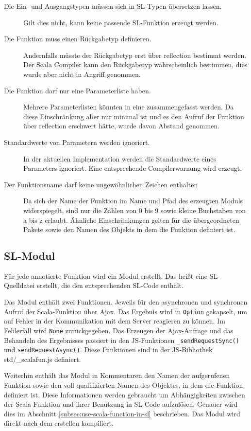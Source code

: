 \documentclass[12pt,bibtotoc]{scrreprt}
\begin{document}
\begin{description}
 \item[Die Ein- und Ausgangstypen müssen sich in SL-Typen übersetzen lassen.]{Gilt dies nicht, kann keine passende SL-Funktion erzeugt werden.}
 \item[Die Funktion muss einen Rückgabetyp definieren.]{Andernfalls müsste der Rückgabetyp erst über reflection bestimmt werden. Der Scala Compiler kann den Rückgabetyp wahrscheinlich bestimmen, dies wurde aber nicht in Angriff genommen.}
 \item[Die Funktion darf nur eine Parameterliste haben.]{Mehrere Parameterlisten könnten in eine zusammengefasst werden. Da diese Einschränkung aber nur minimal ist und es den Aufruf der Funktion über reflection erschwert hätte, wurde davon Abstand genommen.}
 \item[Standardwerte von Parametern werden ignoriert.]{In der aktuellen Implementation werden die Standardwerte eines Parameters ignoriert. Eine entsprechende Compilerwarnung wird erzeugt.}
 \item[Der Funktionsname darf keine ungewöhnlichen Zeichen enthalten]{Da sich der Name der Funktion im Name und Pfad des erzeugten Moduls widerspiegelt, sind nur die Zahlen von 0 bis 9 sowie kleine Buchstaben von a bis z erlaubt. Ähnliche Einschränkungen gelten für die übergeordneten Pakete sowie den Namen des Objekts in dem die Funktion definiert ist.}
\end{description}

\subsection{SL-Modul}
\label{subsec:sl-modul}

Für jede annotierte Funktion wird ein Modul erstellt. Das heißt eine SL-Quelldatei erstellt, die den entsprechenden SL-Code enthält.

Das Modul enthält zwei Funktionen. Jeweils für den asynchronen und synchronen Aufruf der Scala-Funktion über Ajax. Das Ergebnis wird in \lstinline!Option! gekapselt, um auf Fehler in der Kommunikation mit dem Server reagieren zu können. Im Fehlerfall wird \lstinline!None! zurückgegeben. Das Erzeugen der Ajax-Anfrage und das Behandeln des Ergebnisses passiert in den \ac{JS}-Funktionen \lstinline!_sendRequestSync()! und \lstinline!sendRequestAsync()!. Diese Funktionen sind in der \ac{JS}-Bibliothek std/\_scalafun.js definiert. 

Weiterhin enthält das Modul in Kommentaren den Namen der aufgerufenen Funktion sowie den voll qualifizierten Namen des Objektes, in dem die Funktion definiert ist. Diese Informationen werden gebraucht um Abhängigkeiten zwischen der Scala Funktion und ihrer Benutzung in \ac{SL}-Code aufzulösen. Genauer wird dies im Abschnitt \ref{subsec:use-scala-function-in-sl} beschrieben. Das Modul wird direkt nach dem erstellen kompiliert.
\end{document}
